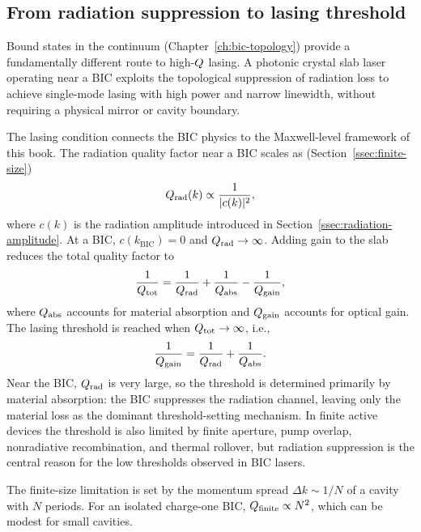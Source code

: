 \subsection{From radiation suppression to lasing threshold}
\label{ssec:bic-laser-device}

Bound states in the continuum (Chapter~\ref{ch:bic-topology}) provide a
fundamentally different route to high-$Q$ lasing. A photonic
crystal slab laser operating near a BIC exploits the topological
suppression of radiation loss to achieve single-mode lasing with high
power and narrow linewidth, without requiring a physical mirror or
cavity boundary.

The lasing condition connects the BIC physics to the Maxwell-level
framework of this book. The radiation quality factor near a BIC scales
as (Section~\ref{ssec:finite-size})
\begin{equation}
 Q_{\mathrm{rad}}(k) \propto \frac{1}{|c(k)|^2},
 \label{eq:bic-q-rad}
\end{equation}
where $c(k)$ is the radiation amplitude introduced in
Section~\ref{ssec:radiation-amplitude}. At a BIC, $c(k_{\mathrm{BIC}}) = 0$
and $Q_{\mathrm{rad}} \to \infty$. Adding gain to the slab
reduces the total quality factor to
\begin{equation}
 \frac{1}{Q_{\mathrm{tot}}} = \frac{1}{Q_{\mathrm{rad}}}
 + \frac{1}{Q_{\mathrm{abs}}} - \frac{1}{Q_{\mathrm{gain}}},
 \label{eq:bic-total-q}
\end{equation}
where $Q_{\mathrm{abs}}$ accounts for material absorption and
$Q_{\mathrm{gain}}$ accounts for optical gain. The lasing threshold
is reached when $Q_{\mathrm{tot}} \to \infty$, i.e.,
\begin{equation}
 \frac{1}{Q_{\mathrm{gain}}} = \frac{1}{Q_{\mathrm{rad}}}
 + \frac{1}{Q_{\mathrm{abs}}}.
 \label{eq:bic-threshold}
\end{equation}
Near the BIC, $Q_{\mathrm{rad}}$ is very large, so the threshold is
determined primarily by material absorption: the BIC suppresses the
radiation channel, leaving only the material loss as the dominant
threshold-setting mechanism. In finite active devices the threshold is
also limited by finite aperture, pump overlap, nonradiative recombination,
and thermal rollover, but radiation suppression is the central reason for
the low thresholds observed in BIC lasers.

The finite-size limitation is set by the momentum spread
$\Delta k \sim 1/N$ of a cavity with $N$ periods. For an isolated
charge-one BIC, $Q_{\mathrm{finite}} \propto N^2$, which can be
modest for small cavities.

